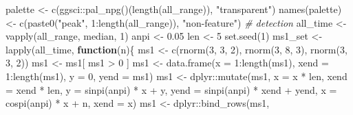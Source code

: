 \documentclass[
]{article}
\newenvironment{Shaded}{\begin{snugshade}}{\end{snugshade}}
\newcommand{\AttributeTok}[1]{\textcolor[rgb]{0.77,0.63,0.00}{#1}}
\newcommand{\CommentTok}[1]{\textcolor[rgb]{0.56,0.35,0.01}{\textit{#1}}}
\newcommand{\ControlFlowTok}[1]{\textcolor[rgb]{0.13,0.29,0.53}{\textbf{#1}}}
\newcommand{\DecValTok}[1]{\textcolor[rgb]{0.00,0.00,0.81}{#1}}
\newcommand{\FloatTok}[1]{\textcolor[rgb]{0.00,0.00,0.81}{#1}}
\newcommand{\FunctionTok}[1]{\textcolor[rgb]{0.00,0.00,0.00}{#1}}
\newcommand{\NormalTok}[1]{#1}
\newcommand{\OtherTok}[1]{\textcolor[rgb]{0.56,0.35,0.01}{#1}}
\newcommand{\SpecialCharTok}[1]{\textcolor[rgb]{0.00,0.00,0.00}{#1}}
\newcommand{\StringTok}[1]{\textcolor[rgb]{0.31,0.60,0.02}{#1}}
\begin{document}
\begin{Shaded}
\begin{Highlighting}[]
\NormalTok{palette }\OtherTok{\textless{}{-}} \FunctionTok{c}\NormalTok{(ggsci}\SpecialCharTok{::}\FunctionTok{pal\_npg}\NormalTok{()(}\FunctionTok{length}\NormalTok{(all\_range)), }\StringTok{"transparent"}\NormalTok{)}
\FunctionTok{names}\NormalTok{(palette) }\OtherTok{\textless{}{-}} \FunctionTok{c}\NormalTok{(}\FunctionTok{paste0}\NormalTok{(}\StringTok{"peak"}\NormalTok{, }\DecValTok{1}\SpecialCharTok{:}\FunctionTok{length}\NormalTok{(all\_range)), }\StringTok{"non{-}feature"}\NormalTok{)}
\CommentTok{\# detection}
\NormalTok{all\_time }\OtherTok{\textless{}{-}} \FunctionTok{vapply}\NormalTok{(all\_range, median, }\DecValTok{1}\NormalTok{)}
\NormalTok{anpi }\OtherTok{\textless{}{-}} \FloatTok{0.05}
\NormalTok{len }\OtherTok{\textless{}{-}} \DecValTok{5}
\FunctionTok{set.seed}\NormalTok{(}\DecValTok{1}\NormalTok{)}
\NormalTok{ms1\_set }\OtherTok{\textless{}{-}} \FunctionTok{lapply}\NormalTok{(all\_time,}
  \ControlFlowTok{function}\NormalTok{(n)\{}
\NormalTok{    ms1 }\OtherTok{\textless{}{-}} \FunctionTok{c}\NormalTok{(}\FunctionTok{rnorm}\NormalTok{(}\DecValTok{3}\NormalTok{, }\DecValTok{3}\NormalTok{, }\DecValTok{2}\NormalTok{), }\FunctionTok{rnorm}\NormalTok{(}\DecValTok{3}\NormalTok{, }\DecValTok{8}\NormalTok{, }\DecValTok{3}\NormalTok{), }\FunctionTok{rnorm}\NormalTok{(}\DecValTok{3}\NormalTok{, }\DecValTok{3}\NormalTok{, }\DecValTok{2}\NormalTok{))}
\NormalTok{    ms1 }\OtherTok{\textless{}{-}}\NormalTok{ ms1[ ms1 }\SpecialCharTok{\textgreater{}} \DecValTok{0}\NormalTok{ ]}
\NormalTok{    ms1 }\OtherTok{\textless{}{-}} \FunctionTok{data.frame}\NormalTok{(}\AttributeTok{x =} \DecValTok{1}\SpecialCharTok{:}\FunctionTok{length}\NormalTok{(ms1), }\AttributeTok{xend =} \DecValTok{1}\SpecialCharTok{:}\FunctionTok{length}\NormalTok{(ms1),}
      \AttributeTok{y =} \DecValTok{0}\NormalTok{, }\AttributeTok{yend =}\NormalTok{ ms1)}
\NormalTok{    ms1 }\OtherTok{\textless{}{-}}\NormalTok{ dplyr}\SpecialCharTok{::}\FunctionTok{mutate}\NormalTok{(ms1,}
      \AttributeTok{x =}\NormalTok{ x }\SpecialCharTok{*}\NormalTok{ len, }\AttributeTok{xend =}\NormalTok{ xend }\SpecialCharTok{*}\NormalTok{ len,}
      \AttributeTok{y =} \FunctionTok{sinpi}\NormalTok{(anpi) }\SpecialCharTok{*}\NormalTok{ x }\SpecialCharTok{+}\NormalTok{ y, }\AttributeTok{yend =} \FunctionTok{sinpi}\NormalTok{(anpi) }\SpecialCharTok{*}\NormalTok{ xend }\SpecialCharTok{+}\NormalTok{ yend,}
      \AttributeTok{x =} \FunctionTok{cospi}\NormalTok{(anpi) }\SpecialCharTok{*}\NormalTok{ x }\SpecialCharTok{+}\NormalTok{ n, }\AttributeTok{xend =}\NormalTok{ x)}
\NormalTok{    ms1 }\OtherTok{\textless{}{-}}\NormalTok{ dplyr}\SpecialCharTok{::}\FunctionTok{bind\_rows}\NormalTok{(ms1,}

\end{Highlighting}
\end{Shaded}
\end{document}
